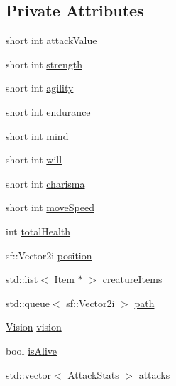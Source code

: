 \subsection*{Private Attributes}
\begin{DoxyCompactItemize}
\item 
short int \mbox{\hyperlink{class_base_creature_ac5a9c850146fa856dbf7fdd0def635ac}{attack\+Value}}
\item 
short int \mbox{\hyperlink{class_base_creature_a7f325c07376932d6e831dd00a350b806}{strength}}
\item 
short int \mbox{\hyperlink{class_base_creature_a23bbce83de8f7be2dfbcec7f5da223ab}{agility}}
\item 
short int \mbox{\hyperlink{class_base_creature_a74bc0648b11f9637b31ad5b76f056740}{endurance}}
\item 
short int \mbox{\hyperlink{class_base_creature_a8debd17b675db2ac6d944e2ccb314def}{mind}}
\item 
short int \mbox{\hyperlink{class_base_creature_a992cbd3a6be93279f2c933a50eba5000}{will}}
\item 
short int \mbox{\hyperlink{class_base_creature_aa62b65a4bd43be6e999d9a29a472fffe}{charisma}}
\item 
short int \mbox{\hyperlink{class_base_creature_a846cd45ba49c6496bdcb760651b9aaa8}{move\+Speed}}
\item 
int \mbox{\hyperlink{class_base_creature_a727462587a0ec421c549acf8c497de42}{total\+Health}}
\item 
sf\+::\+Vector2i \mbox{\hyperlink{class_base_creature_ac0aa7211db6bbc4033b0a11e6c34171b}{position}}
\item 
std\+::list$<$ \mbox{\hyperlink{class_item}{Item}} $\ast$ $>$ \mbox{\hyperlink{class_base_creature_a15a7a38b2a5bc15d1c3f8eda7e1d835b}{creature\+Items}}
\item 
std\+::queue$<$ sf\+::\+Vector2i $>$ \mbox{\hyperlink{class_base_creature_a0e419167e4986de0a4652b8979d66e16}{path}}
\item 
\mbox{\hyperlink{class_vision}{Vision}} \mbox{\hyperlink{class_base_creature_a8433c26fcbcb9bee87c35b15ae2e0814}{vision}}
\item 
bool \mbox{\hyperlink{class_base_creature_adeb6eed7546d84b1547e8134f582a6c7}{is\+Alive}}
\item 
std\+::vector$<$ \mbox{\hyperlink{struct_attack_stats}{Attack\+Stats}} $>$ \mbox{\hyperlink{class_base_creature_ab40c21845e4c19538b356bbcb01f7075}{attacks}}
\end{DoxyCompactItemize}



